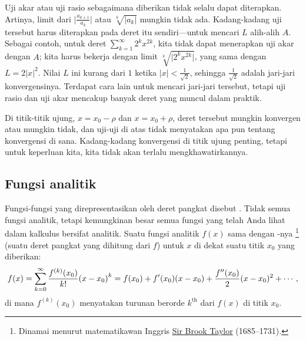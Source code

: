 Uji akar atau uji rasio sebagaimana diberikan tidak selalu dapat diterapkan. Artinya,
limit dari
$\bigl \lvert \frac{a_{k+1}}{a_k} \bigr \rvert$
atau
$\sqrt[k]{\lvert a_k \rvert}$
mungkin tidak ada.
Kadang-kadang uji tersebut harus diterapkan pada deret itu sendiri---untuk mencari
$L$ alih-alih $A$. Sebagai contoh, untuk deret
$\sum_{k=1}^\infty 2^k x^{2k}$, kita tidak dapat menerapkan uji akar dengan $A$; kita
harus bekerja dengan limit $\sqrt[k]{\lvert 2^k x^{2k} \rvert}$,
yang sama dengan $L = 2 {\lvert x \rvert}^2$. Nilai $L$ ini kurang dari $1$ ketika
$\lvert x \rvert < \frac{1}{\sqrt{2}}$, sehingga $\frac{1}{\sqrt{2}}$
adalah jari-jari konvergensinya.
Terdapat cara lain untuk mencari jari-jari tersebut, tetapi uji rasio dan uji akar
mencakup banyak deret yang muncul dalam praktik.

Di titik-titik ujung,
$x = x_0-\rho$ dan $x = x_0+\rho$,
deret tersebut mungkin konvergen atau mungkin tidak, dan uji-uji di atas
tidak menyatakan apa pun tentang konvergensi di sana.
Kadang-kadang konvergensi di titik ujung penting, tetapi untuk
keperluan kita, kita tidak akan terlalu mengkhawatirkannya.

\subsection{Fungsi analitik}

Fungsi-fungsi yang direpresentasikan oleh deret pangkat disebut
\emph{}. Tidak semua fungsi analitik,
tetapi kemungkinan besar semua fungsi yang telah Anda lihat dalam kalkulus bersifat analitik.
Suatu fungsi analitik $f(x)$ sama dengan \emph{}-nya%
\footnote{Dinamai menurut matematikawan Inggris
\href{http://en.wikipedia.org/wiki/Brook_Taylor}{Sir Brook Taylor}
(1685--1731).} (suatu deret pangkat yang dihitung dari $f$)
untuk $x$ di dekat suatu titik $x_0$ yang diberikan:
\begin{equation} \label{ps:tayloreq}
f(x) = \sum_{k=0}^\infty \frac{f^{(k)}(x_0)}{k!} {(x-x_0)}^k 
=
f(x_0)
+ f'(x_0) (x-x_0)
+ \frac{f''(x_0)}{2} (x-x_0)^2
+ \cdots
,
\avoidbreak
\end{equation}
di mana $f^{(k)}(x_0)$ menyatakan turunan berorde $k^{\text{th}}$ dari $f(x)$
di titik $x_0$.


